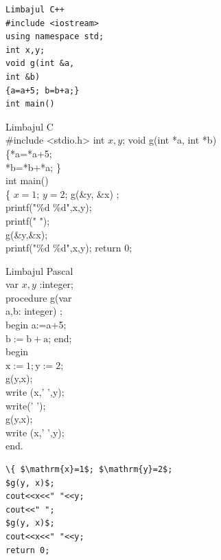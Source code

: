 \documentclass[10pt]{article}
\begin{document}
\begin{verbatim}
Limbajul C++
#include <iostream>
using namespace std;
int x,y;
void g(int &a,
int &b)
{a=a+5; b=b+a;}
int main()
\end{verbatim}

Limbajul C\\
\#include <stdio.h> int $x, y$; void g(int *a, int *b)\\
\{*a=*a+5;\\
*b=*b+*a; \}\\
int main()\\
\{ $x=1$; $y=2$; g(\&y, \&x) ;\\
printf("\%d \%d",x,y);\\
printf(" ");\\
g(\&y,\&x);\\
printf("\%d \%d",x,y); return 0;

Limbajul Pascal\\
var $x, y$ :integer;\\
procedure g(var\\
a,b: integer) ;\\
begin a:=a+5;\\
$\mathrm{b}:=\mathrm{b}+\mathrm{a}$; end;\\
begin\\
$\mathrm{x}:=1 ; \mathrm{y}:=2$;\\
g(y,x);\\
write (x,' ',y);\\
write(' ');\\
g(y,x);\\
write (x,' ',y);\\
end.

\begin{verbatim}
\{ $\mathrm{x}=1$; $\mathrm{y}=2$;
$g(y, x)$;
cout<<x<<" "<<y;
cout<<" ";
$g(y, x)$;
cout<<x<<" "<<y;
return 0;
\end{verbatim}
\end{document}
